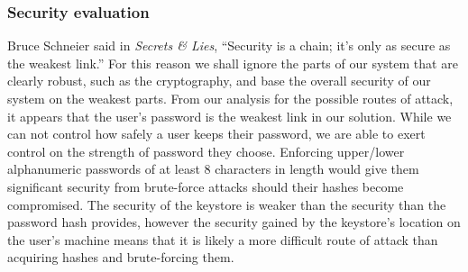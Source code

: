 \documentclass[12pt, titlepage]{article}
\begin{document}
\subsubsection*{Security evaluation}
Bruce Schneier said in \textit{Secrets \& Lies}, ``Security is a chain; it's only as secure as the weakest link.''\cite{schneierSecretsLies} For this reason we shall ignore the parts of our system that are clearly robust, such as the cryptography, and base the overall security of our system on the weakest parts.
\newline \indent From our analysis for the possible routes of attack, it appears that the user's password is the weakest link in our solution. While we can not control how safely a user keeps their password, we are able to exert control on the strength of password they choose. Enforcing upper/lower alphanumeric passwords of at least 8 characters in length would give them significant security from brute-force attacks should their hashes become compromised.
\newline \indent The security of the keystore is weaker than the security than the password hash provides, however the security gained by the keystore's location on the user's machine means that it is likely a more difficult route of attack than acquiring hashes and brute-forcing them.

\newpage
\end{document}

